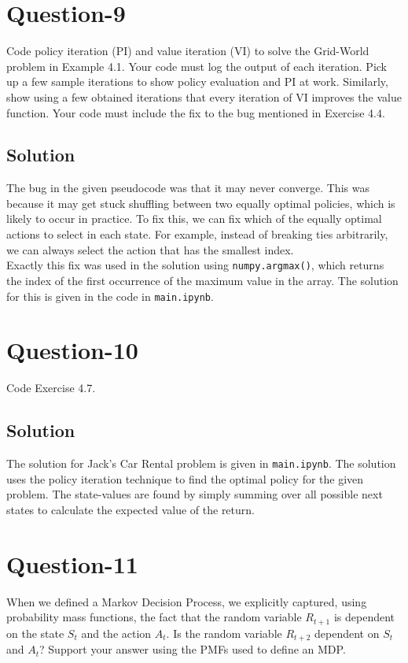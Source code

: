 \documentclass[11pt]{article}
\begin{document}
    \section*{Question-9}
    Code policy iteration (PI) and value iteration (VI) to solve the Grid-World problem in Example 4.1.
    Your code must log the output of each iteration. Pick up a few sample iterations to show policy
    evaluation and PI at work. Similarly, show using a few obtained iterations that every iteration of VI
    improves the value function. Your code must include the fix to the bug mentioned in Exercise 4.4.

    \subsection*{Solution}
    The bug in the given pseudocode was that it may never converge. This was because it may get stuck
    shuffling between two equally optimal policies, which is likely to occur in practice. To fix this, we
    can fix which of the equally optimal actions to select in each state. For example, instead of breaking
    ties arbitrarily, we can always select the action that has the smallest index. \\
    Exactly this fix was used in the solution using \texttt{numpy.argmax()}, which returns the index of
    the first occurrence of the maximum value in the array. The solution for this is given in the code
    in \texttt{main.ipynb}.

    \section*{Question-10}
    Code Exercise 4.7.

    \subsection*{Solution}
    The solution for Jack's Car Rental problem is given in \texttt{main.ipynb}. The solution uses the policy
    iteration technique to find the optimal policy for the given problem. The state-values are found by simply
    summing over all possible next states to calculate the expected value of the return.

    \section*{Question-11}
    When we defined a Markov Decision Process, we explicitly captured, using probability mass functions, the fact
    that the random variable $R_{t+1}$ is dependent on the state $S_{t}$ and the action $A_{t}$. Is the random
    variable $R_{t+2}$ dependent on $S_{t}$ and $A_{t}$? Support your answer using the PMFs used to define an MDP.
\end{document}
